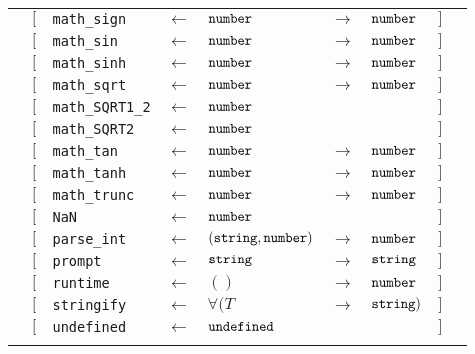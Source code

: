 \begin{tabular}[fragile]{lllllllll}
& $[$ & \texttt{math\_sign} & $\leftarrow$  & $\texttt{number}$ & $\rightarrow$ & $\texttt{number}$ & $]$ \\
& $[$ & \texttt{math\_sin} & $\leftarrow$  & $\texttt{number}$ & $\rightarrow$ & $\texttt{number}$ & $]$ \\
& $[$ & \texttt{math\_sinh} & $\leftarrow$  & $\texttt{number}$ & $\rightarrow$ & $\texttt{number}$ & $]$ \\
& $[$ & \texttt{math\_sqrt} & $\leftarrow$  & $\texttt{number}$ & $\rightarrow$ & $\texttt{number}$ & $]$ \\
& $[$ & \texttt{math\_SQRT1\_2} & $\leftarrow$  & $\texttt{number}$ & & & $]$ \\
& $[$ & \texttt{math\_SQRT2} & $\leftarrow$  & $\texttt{number}$ & & & $]$ \\
& $[$ & \texttt{math\_tan} & $\leftarrow$  & $\texttt{number}$ & $\rightarrow$ & $\texttt{number}$ & $]$ \\
& $[$ & \texttt{math\_tanh} & $\leftarrow$  & $\texttt{number}$ & $\rightarrow$ & $\texttt{number}$ & $]$ \\
& $[$ & \texttt{math\_trunc} & $\leftarrow$  & $\texttt{number}$ & $\rightarrow$ & $\texttt{number}$ & $]$ \\
& $[$ & \texttt{NaN} & $\leftarrow$  & $\texttt{number}$ & & & $]$ \\
& $[$ & \texttt{parse\_int} & $\leftarrow$  & $(\texttt{string}, \texttt{number})$ & $\rightarrow$ & $\texttt{number}$ & $]$ \\
& $[$ & \texttt{prompt} & $\leftarrow$  & $\texttt{string}$ & $\rightarrow$ & $\texttt{string}$ & $]$ \\
& $[$ & \texttt{runtime} & $\leftarrow$  & $()$ & $\rightarrow$ & $\texttt{number}$ & $]$ \\
& $[$ & \texttt{stringify} & $\leftarrow$  & $\forall(T$ & $\rightarrow$ & $\texttt{string})$ & $]$ \\
& $[$ & \texttt{undefined} & $\leftarrow$  & $\texttt{undefined}$ & & & $]$ & \\
& \end{tabular}

